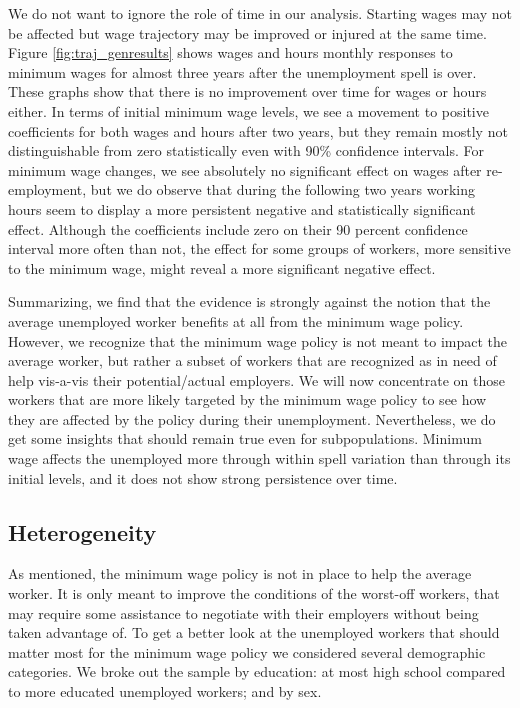 \documentclass{article}
\begin{document}
We do not want to ignore the role of time in our analysis. Starting wages may not be affected but wage trajectory may be improved or injured at the same time. Figure \ref{fig:traj_genresults} shows wages and hours monthly responses to minimum wages for almost three years after the unemployment spell is over. These graphs show that there is no improvement over time for wages or hours either. In terms of initial minimum wage levels, we see a movement to positive coefficients for both wages and hours after two years, but they remain mostly not distinguishable from zero statistically even with 90\% confidence intervals. For minimum wage changes, we see absolutely no significant effect on wages after re-employment, but we do observe that during the following two years working hours seem to display a more persistent negative and statistically significant effect. Although the coefficients include zero on their 90 percent confidence interval more often than not, the effect for some groups of workers, more sensitive to the minimum wage, might reveal a more significant negative effect.

Summarizing, we find that the evidence is strongly against the notion that the average unemployed worker benefits at all from the minimum wage policy. However, we recognize that the minimum wage policy is not meant to impact the average worker, but rather a subset of workers that are recognized as in need of help vis-a-vis their potential/actual employers. We will now concentrate on those workers that are more likely targeted by the minimum wage policy to see how they are affected by the policy during their unemployment. Nevertheless, we do get some insights that should remain true even for subpopulations. Minimum wage affects the unemployed more through within spell variation than through its initial levels, and it does not show strong persistence over time.

\subsection{Heterogeneity}

As mentioned, the minimum wage policy is not in place to help the average worker. It is only meant to improve the conditions of the worst-off workers, that may require some assistance to negotiate with their employers without being taken advantage of. To get a better look at the unemployed workers that should matter most for the minimum wage policy we considered several demographic categories. We broke out the sample by education: at most high school compared to more educated unemployed workers; and by sex.
\end{document}

